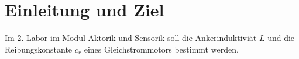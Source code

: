\section{Einleitung und Ziel}

Im 2. Labor im Modul Aktorik und Sensorik soll die Ankerinduktiviät $L$
und die Reibungskonstante $c_r$ eines Gleichstrommotors bestimmt werden.
